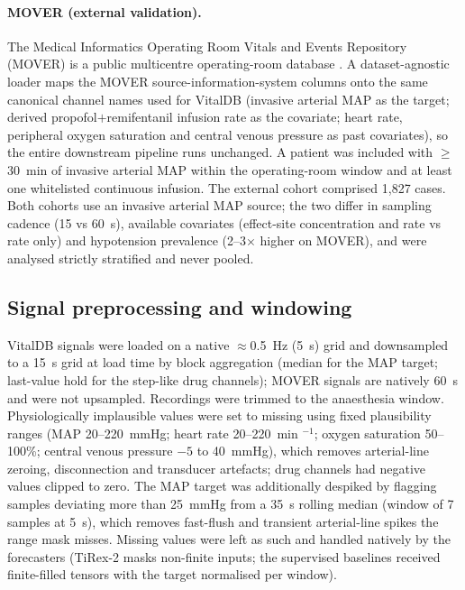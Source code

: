 \documentclass[11pt]{article}
\begin{document}
\paragraph{MOVER (external validation).} The Medical Informatics Operating
Room Vitals and Events Repository (MOVER) is a public multicentre
operating-room database \citep{Samad2023,MOVERUCI2023}. A dataset-agnostic
loader maps the MOVER source-information-system columns onto the same
canonical channel names used for VitalDB (invasive arterial MAP as the
target; derived propofol$+$remifentanil infusion rate as the covariate; heart
rate, peripheral oxygen saturation and central venous pressure as past
covariates), so the entire downstream pipeline runs unchanged. A patient was
included with $\geq$30~min of invasive arterial MAP within the
operating-room window and at least one whitelisted continuous infusion. The
external cohort comprised 1{,}827 cases. Both cohorts use an invasive arterial MAP source; the two differ in
sampling cadence (15 vs 60~s),
available covariates (effect-site concentration and rate vs rate only) and
hypotension prevalence (2--3$\times$ higher on MOVER), and were analysed
strictly stratified and never pooled.

\subsection{Signal preprocessing and windowing}

VitalDB signals were loaded on a native $\approx$0.5~Hz (5~s) grid and
downsampled to a 15~s grid at load time by block aggregation (median for the
MAP target; last-value hold for the step-like drug channels); MOVER signals
are natively 60~s and were not upsampled. Recordings were trimmed to the
anaesthesia window. Physiologically implausible values were set to missing
using fixed plausibility ranges (MAP 20--220~mmHg; heart rate 20--220~min
$^{-1}$; oxygen saturation 50--100\%; central venous pressure
$-5$ to 40~mmHg), which removes arterial-line zeroing, disconnection and
transducer artefacts; drug channels had negative values clipped to zero. The
MAP target was additionally despiked by flagging samples deviating more than
25~mmHg from a 35~s rolling median (window of 7 samples at 5~s), which
removes fast-flush and transient arterial-line spikes the range mask misses.
Missing values were left as such and handled natively by the forecasters
(TiRex-2 masks non-finite inputs; the supervised baselines received
finite-filled tensors with the target normalised per window).
\end{document}
